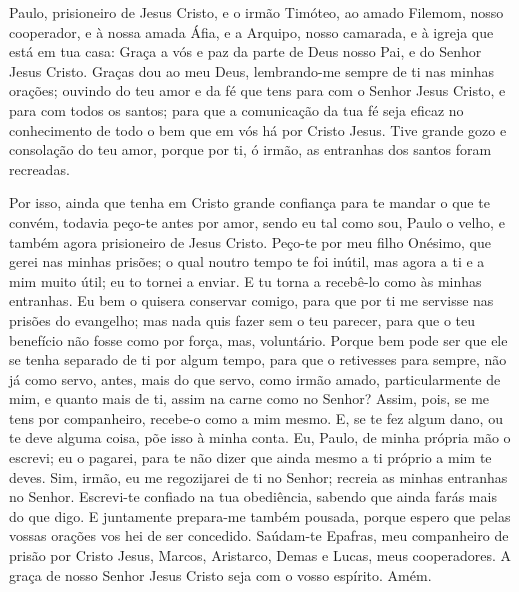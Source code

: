 
Paulo, prisioneiro de Jesus Cristo, e o irmão Timóteo, ao amado
Filemom, nosso cooperador, e à nossa amada Áfia, e a Arquipo,
nosso camarada, e à igreja que está em tua casa: Graça a vós e
paz da parte de Deus nosso Pai, e do Senhor Jesus Cristo. Graças
dou ao meu Deus, lembrando-me sempre de ti nas minhas orações;
ouvindo do teu amor e da fé que tens para com o Senhor Jesus
Cristo, e para com todos os santos; para que a comunicação da
tua fé seja eficaz no conhecimento de todo o bem que em vós há por
Cristo Jesus. Tive grande gozo e consolação do teu amor, porque
por ti, ó irmão, as entranhas dos santos foram recreadas.

Por isso, ainda que tenha em Cristo grande confiança para te
mandar o que te convém, todavia peço-te antes por amor, sendo eu
tal como sou, Paulo o velho, e também agora prisioneiro de Jesus
Cristo. Peço-te por meu filho Onésimo, que gerei nas minhas
prisões; o qual noutro tempo te foi inútil, mas agora a ti e
a mim muito útil; eu to tornei a enviar. E tu torna a
recebê-lo como às minhas entranhas. Eu bem o quisera
conservar comigo, para que por ti me servisse nas prisões do
evangelho; mas nada quis fazer sem o teu parecer, para que o
teu benefício não fosse como por força, mas, voluntário.
Porque bem pode ser que ele se tenha separado de ti por algum
tempo, para que o retivesses para sempre, não já como servo,
antes, mais do que servo, como irmão amado, particularmente de mim,
e quanto mais de ti, assim na carne como no Senhor? Assim,
pois, se me tens por companheiro, recebe-o como a mim mesmo.
E, se te fez algum dano, ou te deve alguma coisa, põe isso à
minha conta. Eu, Paulo, de minha própria mão o escrevi; eu o
pagarei, para te não dizer que ainda mesmo a ti próprio a mim te
deves. Sim, irmão, eu me regozijarei de ti no Senhor; recreia
as minhas entranhas no Senhor. Escrevi-te confiado na tua
obediência, sabendo que ainda farás mais do que digo. E
juntamente prepara-me também pousada, porque espero que pelas vossas
orações vos hei de ser concedido. Saúdam-te Epafras, meu
companheiro de prisão por Cristo Jesus, Marcos, Aristarco,
Demas e Lucas, meus cooperadores. A graça de nosso Senhor
Jesus Cristo seja com o vosso espírito. Amém.
